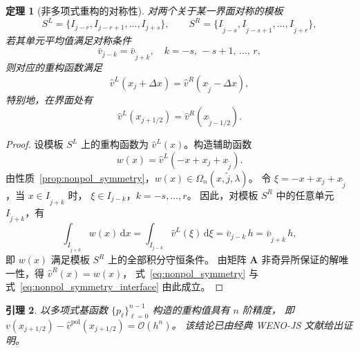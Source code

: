 \documentclass[12pt,a4paper]{article}
\newtheorem{theorem}{定理}[section]
\newtheorem{lemma}[theorem]{引理}
\numberwithin{equation}{section}    %
\begin{document}
\begin{theorem}[非多项式重构的对称性]
    \label{thm:nonpol_symmetry}
    对两个关于某一界面对称的模板
    \begin{equation}
        S^L = \{I_{j-r}, I_{j-r+1}, \ldots, I_{j+s}\},\qquad
        S^R = \{I_{\tilde{j}-s}, I_{\tilde{j}-s+1}, \ldots, I_{\tilde{j}+r}\},
    \end{equation}
    若其单元平均值满足对称条件
    \begin{equation}
        \bar{v}_{j-k} = \bar{v}_{\tilde{j}+k},\quad k = -s,\,-s+1,\,\ldots,\,r,
    \end{equation}
    则对应的重构函数满足
    \begin{equation}
        \label{eq:nonpol_symmetry}
        \hat{v}^{L}(x_j+\Delta x) = \hat{v}^{R}(x_{\tilde{j}}-\Delta x),
    \end{equation}
    特别地，在界面处有
    \begin{equation}
        \label{eq:nonpol_symmetry_interface}
        \hat{v}^{L}(x_{j+1/2}) = \hat{v}^{R}(x_{\tilde{j}-1/2}).
    \end{equation}
\end{theorem}

\begin{proof}
    设模板 $S^L$ 上的重构函数为 $\hat{v}^L(x)$。构造辅助函数
    \begin{equation}
        w(x) = \hat{v}^L(-x + x_j + x_{\tilde{j}}).
    \end{equation}
    由性质~\ref{prop:nonpol_symmetry}，$w(x) \in \Omega_n(x, \tilde{j}, \lambda)$。
    令 $\xi = -x + x_j + x_{\tilde{j}}$，当 $x \in I_{\tilde{j}+k}$ 时，
    $\xi \in I_{j-k}$，$k = -s, \ldots, r$。
    因此，对模板 $S^R$ 中的任意单元 $I_{\tilde{j}+k}$，有
    \begin{equation}
        \int_{I_{\tilde{j}+k}} w(x)\,\mathrm{d}x
        = \int_{I_{j-k}} \hat{v}^L(\xi)\,\mathrm{d}\xi
        = \bar{v}_{j-k}\,h = \bar{v}_{\tilde{j}+k}\,h,
    \end{equation}
    即 $w(x)$ 满足模板 $S^R$ 上的全部积分守恒条件。
    由矩阵 $\bm{A}$ 非奇异所保证的解唯一性，得 $\hat{v}^R(x) = w(x)$，
    式~\eqref{eq:nonpol_symmetry} 与式~\eqref{eq:nonpol_symmetry_interface} 由此成立。
\end{proof}

\begin{lemma}
    \label{lem:pol_accuracy}
    以多项式基函数 $\{p_\ell\}_{\ell=0}^{n-1}$ 构造的重构值具有 $n$ 阶精度，
    即 $v(x_{j+1/2}) - \hat{v}^{\mathrm{pol}}(x_{j+1/2}) = \mathcal{O}(h^n)$。
    该结论已由经典 WENO-JS 文献给出证明。
\end{lemma}
\end{document}
